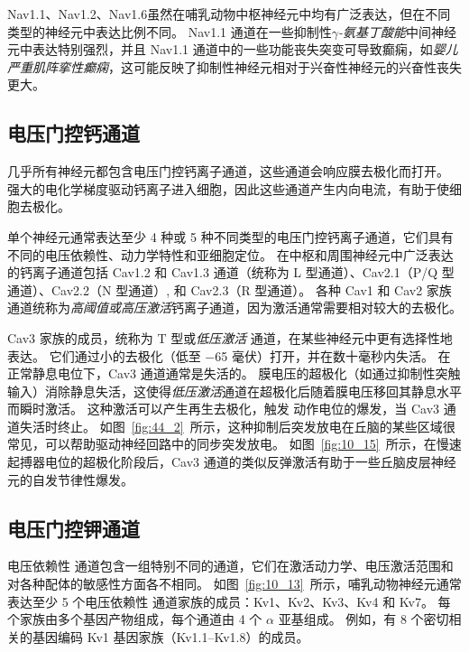 Nav1.1、Nav1.2、Nav1.6虽然在哺乳动物中枢神经元中均有广泛表达，但在不同类型的神经元中表达比例不同。
Nav1.1 通道在一些抑制性\textit{$\gamma$-氨基丁酸能}中间神经元中表达特别强烈，并且 Nav1.1 通道中的一些功能丧失突变可导致癫痫，如\textit{婴儿严重肌阵挛性癫痫}，这可能反映了抑制性神经元相对于兴奋性神经元的兴奋性丧失更大。



\subsection{电压门控钙通道}

几乎所有神经元都包含电压门控钙离子通道，这些通道会响应膜去极化而打开。
强大的电化学梯度驱动钙离子进入细胞，因此这些通道产生内向电流，有助于使细胞去极化。


单个神经元通常表达至少 4 种或 5 种不同类型的电压门控钙离子通道，它们具有不同的电压依赖性、动力学特性和亚细胞定位。
在中枢和周围神经元中广泛表达的钙离子通道包括 Cav1.2 和 Cav1.3 通道（统称为 L 型通道）、Cav2.1（P/Q 型通道）、Cav2.2（N 型通道）, 和 Cav2.3（R 型通道）。
各种 Cav1 和 Cav2 家族通道统称为\textit{高阈值或高压激活}钙离子通道，因为激活通常需要相对较大的去极化。


Cav3 家族的成员，统称为 T 型或\textit{低压激活} 通道，在某些神经元中更有选择性地表达。
它们通过小的去极化（低至 −65 毫伏）打开，并在数十毫秒内失活。
在正常静息电位下，Cav3 通道通常是失活的。
膜电压的超极化（如通过抑制性突触输入）消除静息失活，这使得\textit{低压激活}通道在超极化后随着膜电压移回其静息水平而瞬时激活。
这种激活可以产生再生去极化，触发  动作电位的爆发，当 Cav3 通道失活时终止。 
如图~\ref{fig:44_2}~所示，这种抑制后突发放电在丘脑的某些区域很常见，可以帮助驱动神经回路中的同步突发放电。 
如图~\ref{fig:10_15}~所示，在慢速起搏器电位的超极化阶段后，Cav3 通道的类似反弹激活有助于一些丘脑皮层神经元的自发节律性爆发。



\subsection{电压门控钾通道}

电压依赖性  通道包含一组特别不同的通道，它们在激活动力学、电压激活范围和对各种配体的敏感性方面各不相同。
如图~\ref{fig:10_13}~所示，哺乳动物神经元通常表达至少 5 个电压依赖性  通道家族的成员：Kv1、Kv2、Kv3、Kv4 和 Kv7。
每个家族由多个基因产物组成，每个通道由 4 个 $\alpha$ 亚基组成。
例如，有 8 个密切相关的基因编码 Kv1 基因家族（Kv1.1–Kv1.8）的成员。


